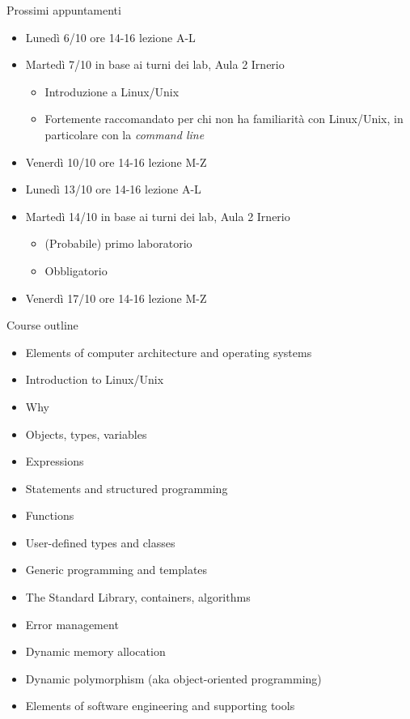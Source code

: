 \begin{frame}{Prossimi appuntamenti \insertcontinuationtext}
  \begin{itemize}

  \item Lunedì 6/10 ore 14-16 lezione A-L

  \item Martedì 7/10 in base ai turni dei lab, Aula 2 Irnerio
    \begin{itemize}
    \item Introduzione a Linux/Unix
    \item Fortemente raccomandato per chi non ha familiarità con Linux/Unix, in
      particolare con la \textit{command line}
    \end{itemize}

  \item Venerdì 10/10 ore 14-16 lezione M-Z
  \item Lunedì 13/10 ore 14-16 lezione A-L

  \item Martedì 14/10 in base ai turni dei lab, Aula 2 Irnerio
    \begin{itemize}
    \item (Probabile) primo laboratorio
    \item Obbligatorio
    \end{itemize}

  \item Venerdì 17/10 ore 14-16 lezione M-Z

  \end{itemize}
\end{frame}

\begin{frame}{Course outline}
  \begin{itemize}
  \item<1-> Elements of computer architecture and operating systems
  \item<2-> Introduction to Linux/Unix
  \item<3-> Why \Cpp{}
  \item<4-> Objects, types, variables
  \item<4-> Expressions
  \item<4-> Statements and structured programming
  \item<4-> Functions
  \item<4-> User-defined types and classes
  \item<4-> Generic programming and templates
  \item<4-> The Standard Library, containers, algorithms
  \item<4-> Error management
  \item<4-> Dynamic memory allocation
  \item<4-> Dynamic polymorphism (aka object-oriented programming)
  \item<5-> Elements of software engineering and supporting tools
  \end{itemize}
\end{frame}
